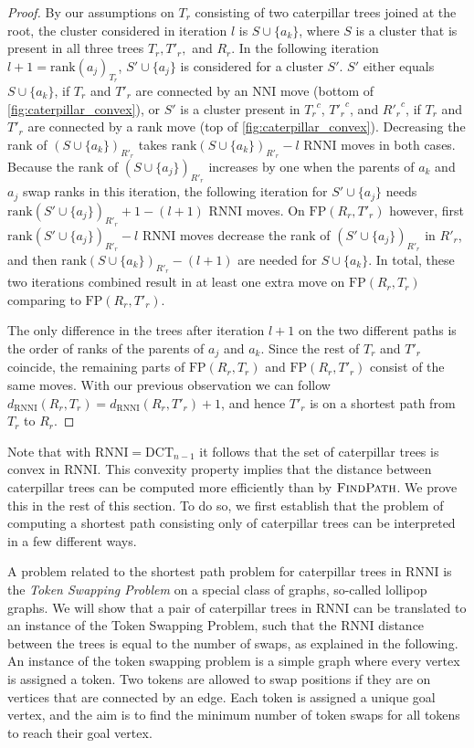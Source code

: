 \documentclass[11pt]{amsart}
\newcommand{\rnni}{\mathrm{RNNI}}
\newcommand{\findpath}{\textsc{FindPath}}
\newcommand{\rank}{\mathrm{rank}}
\newcommand{\nni}{\mathrm{NNI}}
\newcommand{\fp}{\mathrm{FP}}
\newcommand{\dct}{\mathrm{DCT}}
\begin{document}
\begin{proof}
	By our assumptions on $T_r$ consisting of two caterpillar trees joined at the root, the cluster considered in iteration $l$ is $S \cup \{a_k\}$, where $S$ is a cluster that is present in all three trees $T_r, T'_r,$ and $R_r$.
	In the following iteration $l+1 = \rank(a_j)_{T_r}$, $S' \cup \{a_j\}$ is considered for a cluster $S'$.
	$S'$ either equals $S \cup \{a_k\}$, if $T_r$ and $T'_r$ are connected by an $\nni$ move (bottom of \autoref{fig:caterpillar_convex}), or $S'$ is a cluster present in ${T_r}^c$, ${T'_r}^c$, and ${R'_r}^c$, if $T_r$ and $T'_r$ are connected by a rank move (top of \autoref{fig:caterpillar_convex}).
	Decreasing the rank of $(S \cup \{a_k\})_{R'_r}$ takes $\rank(S \cup \{a_k\})_{R'_r} - l$ $\rnni$ moves in both cases.
	Because the rank of $(S \cup \{a_j\})_{R'_r}$ increases by one when the parents of $a_k$ and $a_j$ swap ranks in this iteration, the following iteration for $S' \cup \{a_j\}$ needs $\rank(S' \cup \{a_j\})_{R'_r} + 1 - (l+1)$ $\rnni$ moves.
	On $\fp(R_r,T'_r)$ however, first $\rank(S' \cup \{a_j\})_{R'_r} - l$ $\rnni$ moves decrease the rank of $(S' \cup \{a_j\})_{R'_r}$ in $R'_r$, and then $\rank(S \cup \{a_k\})_{R'_r} - (l+1)$ are needed for $S \cup \{a_k\}$.
	In total, these two iterations combined result in at least one extra move on $\fp(R_r, T_r)$ comparing to $\fp(R_r, T'_r)$.

	The only difference in the trees after iteration $l+1$ on the two different paths is the order of ranks of the parents of $a_j$ and $a_k$.
	Since the rest of $T_r$ and $T'_r$ coincide, the remaining parts of $\fp(R_r, T_r)$ and $\fp(R_r, T'_r)$ consist of the same moves.
	With our previous observation we can follow $d_{\rnni}(R_r,T_r) = d_{\rnni}(R_r,T'_r) + 1$, and hence $T'_r$ is on a shortest path from $T_r$ to $R_r$.
\end{proof}

Note that with $\rnni = \dct_{n-1}$ it follows that the set of caterpillar trees is convex in $\rnni$.
This convexity property implies that the distance between caterpillar trees can be computed more efficiently than by $\findpath$.
We prove this in the rest of this section.
To do so, we first establish that the problem of computing a shortest path consisting only of caterpillar trees can be interpreted in a few different ways.

A problem related to the shortest path problem for caterpillar trees in $\rnni$ is the \emph{Token Swapping Problem} \autocite{Kawahara2017-ey} on a special class of graphs, so-called lollipop graphs.
We will show that a pair of caterpillar trees in $\rnni$ can be translated to an instance of the Token Swapping Problem, such that the $\rnni$ distance between the trees is equal to the number of swaps, as explained in the following.
An instance of the token swapping problem is a simple graph where every vertex is assigned a token.
Two tokens are allowed to swap positions if they are on vertices that are connected by an edge.
Each token is assigned a unique goal vertex, and the aim is to find the minimum number of token swaps for all tokens to reach their goal vertex.
\end{document}
